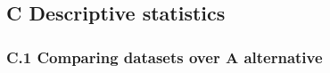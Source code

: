 \documentclass[12pt,]{article}
\begin{document}
\FloatBarrier

\newpage

\FloatBarrier

\hypertarget{c-descriptive-statistics}{%
\subsection*{C Descriptive statistics}\label{c-descriptive-statistics}}

\hypertarget{c.1-comparing-datasets-over-a-alternative}{%
\subsubsection*{C.1 Comparing datasets over A
alternative}\label{c.1-comparing-datasets-over-a-alternative}}

\FloatBarrier

\FloatBarrier
\end{document}
